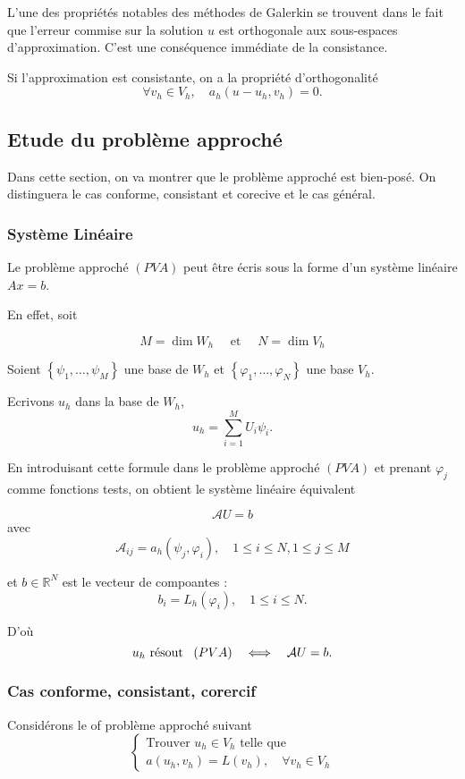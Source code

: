 L'une des propriétés notables des méthodes de Galerkin se trouvent dans le fait que l'erreur commise sur la solution $u$  est orthogonale aux sous-espaces d'approximation. C'est une conséquence immédiate de la consistance.


\begin{proposition}[Orthogonalité]
	
Si l'approximation est 	consistante,  on a la propriété d'orthogonalité 
$$
\forall v_{h} \in V_{h}, \quad a_{h}\left(u-u_{h}, v_{h}\right)=0. 
$$

\end{proposition}
\subsection{Etude du problème approché}

Dans cette section, on va montrer que le problème approché est bien-posé.  On distinguera le cas conforme, consistant et corecive et le cas général.


\subsubsection{Système Linéaire}
Le problème approché $(PVA)$  peut être écris sous la forme d'un système linéaire $Ax=b$. 

En effet, soit 

$$
M=\operatorname{dim} W_{h} \quad \text { et  } \quad N=\operatorname{dim} V_{h}
$$

Soient $\left\{\psi_{1}, \ldots, \psi_{M}\right\}$ une base de $W_{h}$  et  $\left\{\varphi_{1}, \ldots, \varphi_{N}\right\}$ une base  $V_{h}$.  

Ecrivons  $u_{h}$ dans  la base de  $W_{h}$,
$$
u_{h}=\sum_{i=1}^{M} U_{i} \psi_{i}.
$$

En introduisant cette formule dans le problème approché $(PVA)$ et prenant $\varphi_j$ comme fonctions tests, on obtient le système linéaire équivalent  

$$
\mathcal{A} U=b
$$
avec 
$$
\mathcal{A}_{i j}=a_{h}\left(\psi_{j}, \varphi_{i}\right), \quad 1 \leq i \leq N, 1 \leq j \leq M
$$

et  $b \in \mathbb{R}^{N}$ est le vecteur de  compoantes :
$$
b_{i}=L_{h}\left(\varphi_{i}\right), \quad 1 \leq i \leq N.
$$

D'où
$$
u_{h} \text { résout \,  }(PVA)\quad \Longleftrightarrow \quad \mathcal{A} U=b.
$$


\subsubsection{Cas conforme, consistant, corercif}
 Considérons le  of problème approché suivant 
$$
\left\{\begin{array}{l}
	\text {Trouver  } u_{h} \in V_{h} \text { telle que  } \\
	a\left(u_{h}, v_{h}\right)=L\left(v_{h}\right), \quad \forall v_{h} \in V_{h}
\end{array}\right.
$$

